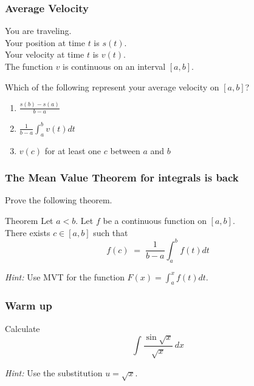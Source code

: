 \begin{frame}[t]
	\fontsize{13}{13}\selectfont
	\frametitle{Average Velocity}

	You are traveling. \\ Your position at time $t$ is $s(t)$. \\ Your velocity at
	time $t$ is $v(t)$. \\ The function $v$ is continuous on an interval $[a,b]$.

	Which of the following represent your average velocity on $[a,b]$?

	\begin{enumerate}
		\item $\displaystyle \frac{s(b) - s(a)}{b-a}$

		\item $\displaystyle \frac{1}{b-a}\int_{a}^{b}v(t) dt$

		\item $v(c)$ for at least one $c$ between $a$ and $b$
	\end{enumerate}
\end{frame}

\begin{frame}[t]
	\fontsize{13}{13}\selectfont
	\frametitle{The Mean Value Theorem for integrals is back}

	Prove the following theorem.

	\begin{block}{\fontsize{13}{13}\selectfont Theorem}
		Let $a < b$. Let $f$ be a continuous function on $[a,b]$. \\ There exists $c
		\in [a,b]$ such that
		\vspace{-.5cm}
		\[
			f(c) \; = \; \frac{1}{b-a}\int_{a}^{b}f(t) dt
		\]
	\end{block}


	\emph{Hint:} Use MVT for the function
	$\displaystyle F(x) = \int_{a}^{x}f(t) dt$.
\end{frame}

\begin{frame}[t]
	\frametitle{Warm up}

	Calculate
	\[
		\int \frac{\sin \sqrt{x}}{\sqrt{x}}\, dx
	\]

	\emph{Hint:} Use the substitution $\displaystyle u=\sqrt{x}$.
\end{frame}

